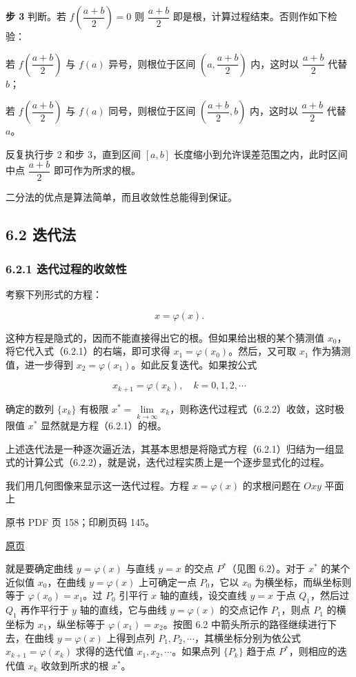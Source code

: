 \textbf{步 3} 判断。若 \(f\left(\dfrac{a+b}{2}\right)=0\) 则 \(\dfrac{a+b}{2}\) 即是根，计算过程结束。否则作如下检验：

若 \(f\left(\dfrac{a+b}{2}\right)\) 与 \(f(a)\) 异号，则根位于区间 \(\left(a,\dfrac{a+b}{2}\right)\) 内，这时以 \(\dfrac{a+b}{2}\) 代替 \(b\)；

若 \(f\left(\dfrac{a+b}{2}\right)\) 与 \(f(a)\) 同号，则根位于区间 \(\left(\dfrac{a+b}{2},b\right)\) 内，这时以 \(\dfrac{a+b}{2}\) 代替 \(a\)。

反复执行步 2 和步 3，直到区间 \([a,b]\) 长度缩小到允许误差范围之内，此时区间中点 \(\dfrac{a+b}{2}\) 即可作为所求的根。

二分法的优点是算法简单，而且收敛性总能得到保证。

\subsection{6.2 迭代法}\label{ch06-ux8fedux4ee3ux6cd5}

\subsubsection{6.2.1 迭代过程的收敛性}\label{ch06-ux8fedux4ee3ux8fc7ux7a0bux7684ux6536ux655bux6027}

考察下列形式的方程：

\[
x=\varphi(x).
\tag{6.2.1}
\]

这种方程是隐式的，因而不能直接得出它的根。但如果给出根的某个猜测值 \(x_0\)，将它代入式（6.2.1）的右端，即可求得 \(x_1=\varphi(x_0)\)。然后，又可取 \(x_1\) 作为猜测值，进一步得到 \(x_2=\varphi(x_1)\)。如此反复迭代。如果按公式

\[
x_{k+1}=\varphi(x_k),\quad k=0,1,2,\cdots
\tag{6.2.2}
\]

确定的数列 \(\{x_k\}\) 有极限 \(x^*=\lim\limits_{k\to\infty}x_k\)，则称迭代过程式（6.2.2）收敛，这时极限值 \(x^*\) 显然就是方程（6.2.1）的根。

上述迭代法是一种逐次逼近法，其基本思想是将隐式方程（6.2.1）归结为一组显式的计算公式（6.2.2），就是说，迭代过程实质上是一个逐步显式化的过程。

我们用几何图像来显示这一迭代过程。方程 \(x=\varphi(x)\) 的求根问题在 \(Oxy\) 平面上

\clearpage

原书 PDF 页 158；印刷页码 145。

\href{source-images/pdf-158.jpeg}{原页}

就是要确定曲线 \(y=\varphi(x)\) 与直线 \(y=x\) 的交点 \(P^*\)（见图 6.2）。对于 \(x^*\) 的某个近似值 \(x_0\)，在曲线 \(y=\varphi(x)\) 上可确定一点 \(P_0\)，它以 \(x_0\) 为横坐标，而纵坐标则等于 \(\varphi(x_0)=x_1\)。过 \(P_0\) 引平行 \(x\) 轴的直线，设交直线 \(y=x\) 于点 \(Q_1\)，然后过 \(Q_1\) 再作平行于 \(y\) 轴的直线，它与曲线 \(y=\varphi(x)\) 的交点记作 \(P_1\)，则点 \(P_1\) 的横坐标为 \(x_1\)，纵坐标等于 \(\varphi(x_1)=x_2\)。按图 6.2 中箭头所示的路径继续进行下去，在曲线 \(y=\varphi(x)\) 上得到点列 \(P_1,P_2,\cdots\)，其横坐标分别为依公式 \(x_{k+1}=\varphi(x_k)\) 求得的迭代值 \(x_1,x_2,\cdots\)。如果点列 \(\{P_k\}\) 趋于点 \(P^*\)，则相应的迭代值 \(x_k\) 收敛到所求的根 \(x^*\)。

